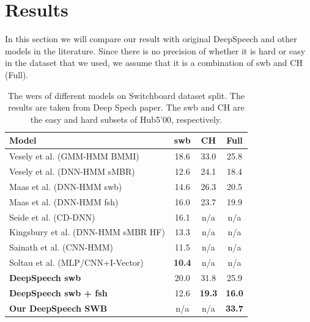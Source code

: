 \documentclass[12pt]{article}
\begin{document}
\section{Results}
\label{section: results}
In this section we will compare our result with original DeepSpeech and other models in the literature. Since there is no precision of whether it is hard or easy in the dataset that we used, we assume that it is a combination of \gls{swb} and CH (Full).
\begin{table}
    \begin{center}
        \begin{tabular}{l|c|c|c}
            \textbf{Model}                                                     & \textbf{\gls{swb}} & \textbf{CH}   & \textbf{Full}  \\
            \hline
            Vesely et al. (GMM-HMM BMMI) \cite{vesely_44}                      & 18.6               & 33.0          & 25.8           \\
            Vesely et al. (DNN-HMM sMBR) \cite{vesely_44}                      & 12.6               & 24.1          & 18.4           \\

            Maas et al. (DNN-HMM \gls{swb}) \cite{maas_28}                     & 14.6               & 26.3          & 20.5           \\
            Maas et al. (DNN-HMM \gls{fsh}) \cite{maas_28}                     & 16.0               & 23.7          & 19.9           \\

            Seide et al. (CD-DNN) \cite{seide_39}                              & 16.1               & n/a           & n/a            \\
            Kingsbury et al. (DNN-HMM sMBR HF) \cite{kingsbury_22}             & 13.3               & n/a           & n/a            \\

            Sainath et al. (CNN-HMM) \cite{sainath_36}                         & 11.5               & n/a           & n/a            \\

            Soltau et al. (MLP/CNN+I-Vector) \cite{soltau_40}                  & \textbf{10.4}      & n/a           & n/a            \\
            \textbf{DeepSpeech \gls{swb}} \cite{deepspeech_paper}              & 20.0               & 31.8          & 25.9           \\

            \textbf{DeepSpeech \gls{swb} + \gls{fsh} } \cite{deepspeech_paper} & 12.6               & \textbf{19.3} & \textbf{16.0}  \\
            \textbf{Our DeepSpeech SWB}                                        & n/a                & n/a           & \textbf{33.7 } \\
        \end{tabular}
        \caption{The \glspl{wer} of different models on Switchboard dataset split. The results are taken from Deep Spech paper. The \gls{swb} and CH are the easy and hard subsets of Hub5'00, respectively.}
        \label{result_table}
    \end{center}
\end{table}
\end{document}
